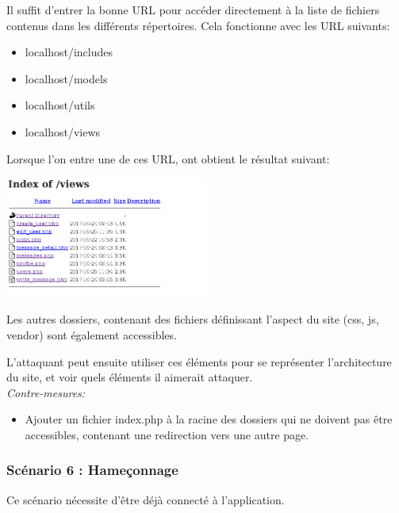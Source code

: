 \documentclass{article}
\begin{document}
Il suffit d'entrer la bonne URL pour accéder directement à la liste de
fichiers contenus dans les différents répertoires. Cela fonctionne avec
les URL suivants:

\begin{itemize}

\item
  localhost/includes
\item
  localhost/models
\item
  localhost/utils
\item
  localhost/views
\end{itemize}

Lorsque l'on entre une de ces URL, ont obtient le résultat suivant:

\begin{center}\includegraphics[width=0.5\textwidth]{images/repertoire.png}\end{center}

Les autres dossiers, contenant des fichiers définissant l'aspect du site
(css, js, vendor) sont également accessibles.

L'attaquant peut ensuite utiliser ces éléments pour se représenter
l'architecture du site, et voir quels éléments il aimerait attaquer.\\

\textit{Contre-mesures:}

\begin{itemize}

\item
  Ajouter un fichier index.php à la racine des dossiers qui ne doivent
  pas être accessibles, contenant une redirection vers une autre page.
\end{itemize}

\subsubsection{Scénario 6 : Hameçonnage}

Ce scénario nécessite d'être déjà connecté à l'application.\\
\end{document}
